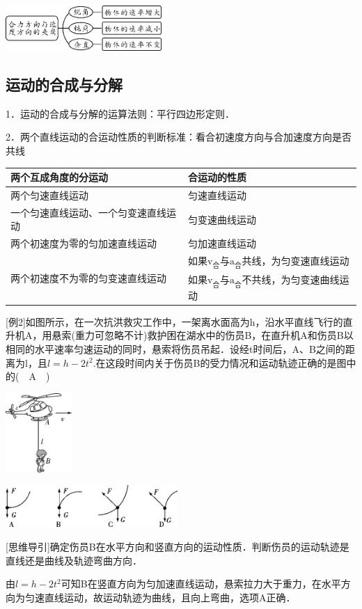 \begin{center}\includegraphics[width=2.33333in,height=0.67708in]{media/image142.png}\end{center}
\newpage
\subsection{运动的合成与分解}

1．运动的合成与分解的运算法则：平行四边形定则．

2．两个直线运动的合运动性质的判断标准：看合初速度方向与合加速度方向是否共线

\begin{longtable}[]{@{}ll@{}}
\toprule
两个互成角度的分运动 & 合运动的性质\tabularnewline
\midrule
\endhead
两个匀速直线运动 & 匀速直线运动\tabularnewline
一个匀速直线运动、一个匀变速直线运动 & 匀变速曲线运动\tabularnewline
两个初速度为零的匀加速直线运动 & 匀加速直线运动\tabularnewline
\multirow{2}{6cm}{两个初速度不为零的匀变速直线运动}
 &
如果$\mathrm v_{\text{合}}$与$\mathrm a_{\text{合}}$共线，为匀变速直线运动\tabularnewline
& 如果$\mathrm v_{\text{合}}$与$\mathrm a_{\text{合}}$不共线，为匀变速曲线运动\tabularnewline
\bottomrule
\end{longtable}

{[}例2{]}如图所示，在一次抗洪救灾工作中，一架离水面高为h，沿水平直线飞行的直升机A，用悬索(重力可忽略不计)救护困在湖水中的伤员B，在直升机A和伤员B以相同的水平速率匀速运动的同时，悬索将伤员吊起．设经t时间后，A、B之间的距离为l，且$l=h-2t^2$.在这段时间内关于伤员B的受力情况和运动轨迹正确的是图中的(　A　)

\begin{center}\includegraphics[width=0.98958in,height=1.1875in]{media/image143.png}\end{center}
\begin{center}\includegraphics[width=2.57292in,height=0.625in]{media/image144.png}\end{center}
{[}思维导引{]}确定伤员B在水平方向和竖直方向的运动性质．判断伤员的运动轨迹是直线还是曲线及轨迹弯曲方向．
\begin{solution}
	由$l=h-2t^2$可知B在竖直方向为匀加速直线运动，悬索拉力大于重力，在水平方向为匀速直线运动，故运动轨迹为曲线，且向上弯曲，选项A正确．
\end{solution}


